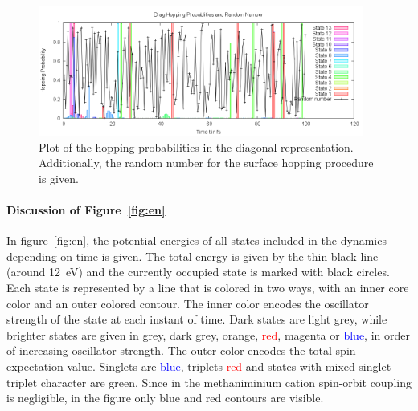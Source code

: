 \documentclass[a4paper,11pt,DIV=15,openany]{scrbook}
\begin{document}
\begin{figure}[p]
  \centering
  \includegraphics[width=0.95\textwidth]{figures/prob.png}
  \caption{Plot of the hopping probabilities in the diagonal representation. Additionally, the random number for the surface hopping procedure is given.}
  \label{fig:prob}
\end{figure}

\paragraph{Discussion of Figure~\ref{fig:en}}

In figure~\ref{fig:en}, the potential energies of all states included in the dynamics depending on time is given. 
The total energy is given by the thin black line (around 12~eV) and the currently occupied state is marked with black circles. 
Each state is represented by a line that is colored in two ways, with an inner core color and an outer colored contour.
The inner color encodes the oscillator strength of the state at each instant of time. 
Dark states are \textcolor{black!20}{light grey}, while brighter states are given in \textcolor{black!40}{grey}, \textcolor{black!70}{dark grey}, \textcolor{red!60!green}{orange}, \textcolor{red}{red}, \textcolor{red!50!blue}{magenta} or \textcolor{blue}{blue}, in order of increasing oscillator strength. 
The outer color encodes the total spin expectation value. 
Singlets are \textcolor{blue}{blue}, triplets \textcolor{red}{red} and states with mixed singlet-triplet character are \textcolor{green!90!black}{green}. 
Since in the methaniminium cation spin-orbit coupling is negligible, in the figure only blue and red contours are visible.
\end{document}
